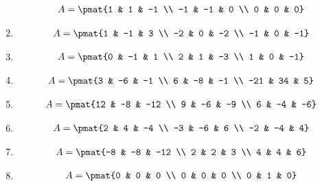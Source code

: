 \begin{enumerate}
\begin{align*}
A = \pmat{1 & 1 & -1 \\ -1 & -1 & 0 \\ 0 & 0 & 0}
\end{align*}

\item

\begin{align*}
A = \pmat{1 & -1 & 3 \\ -2 & 0 & -2 \\ -1 & 0 & -1}
\end{align*}

\item

\begin{align*}
A = \pmat{0 & -1 & 1 \\ 2 & 1 & -3 \\ 1 & 0 & -1}
\end{align*}

\item

\begin{align*}
A = \pmat{3 & -6 & -1 \\ 6 & -8 & -1 \\ -21 & 34 & 5}
\end{align*}

\item

\begin{align*}
A = \pmat{12 & -8 & -12 \\ 9 & -6 & -9 \\ 6 & -4 & -6}
\end{align*}

\item

\begin{align*}
A = \pmat{2 & 4 & -4 \\ -3 & -6 & 6 \\ -2 & -4 & 4}
\end{align*}

\item

\begin{align*}
A = \pmat{-8 & -8 & -12 \\ 2 & 2 & 3 \\ 4 & 4 & 6}
\end{align*}

\item

\begin{align*}
A = \pmat{0 & 0 & 0 \\ 0 & 0 & 0 \\ 0 & 1 & 0}
\end{align*}


\end{enumerate}
